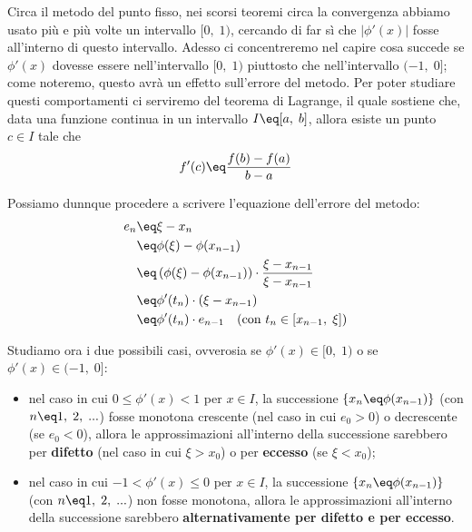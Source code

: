 Circa il metodo del punto fisso, nei scorsi teoremi circa la convergenza abbiamo usato più e più volte un intervallo $[0, \; 1)$, cercando di far sì che $|\phi'(x)|$ fosse all'interno di questo intervallo. Adesso ci concentreremo nel capire cosa succede se $\phi'(x)$ dovesse essere nell'intervallo $[0, \; 1)$ piuttosto che nell'intervallo $(-1, \; 0]$; come noteremo, questo avrà un effetto sull'errore del metodo. Per poter studiare questi comportamenti ci serviremo del teorema di Lagrange, il quale sostiene che, data una funzione continua in un intervallo $I \eq [a, \; b]$, allora esiste un punto $c \in I$ tale che
\[ f'(c) \eq \frac{f(b) - f(a)}{b - a} \]

Possiamo dunnque procedere a scrivere l'equazione dell'errore del metodo:
\begin{align*}
    e_n &\eq \xi - x_n \\
    &\eq \phi(\xi) - \phi(x_{n - 1}) \\
    &\eq \left(\phi(\xi) - \phi(x_{n - 1})\right) \cdot \frac{\xi - x_{n - 1}}{\xi - x_{n - 1}} \\
    &\eq \phi'(t_n) \cdot (\xi - x_{n - 1}) \\
    &\eq \phi'(t_n) \cdot e_{n - 1} \quad (\text{con } t_n \in [x_{n - 1}, \; \xi]) 
\end{align*}

Studiamo ora i due possibili casi, ovverosia se $\phi'(x) \in [0, \; 1)$ o se $\phi'(x) \in (-1, \; 0]$:
\begin{itemize}
    \item nel caso in cui $0 \leq \phi'(x) < 1$ per $x \in I$, la successione $\{x_n \eq \phi(x_{n - 1})\}$ (con $n \eq 1, \; 2, \; ...$) fosse monotona crescente (nel caso in cui $e_0 > 0$) o decrescente (se $e_0 < 0$), allora le approssimazioni all'interno della successione sarebbero per \textbf{difetto} (nel caso in cui $\xi > x_0$) o per \textbf{eccesso} (se $\xi < x_0$);
    \item nel caso in cui $-1 < \phi'(x) \leq 0$ per $x \in I$, la successione $\{x_n \eq \phi(x_{n - 1})\}$ (con $n \eq 1, \; 2, \; ...$) non fosse monotona, allora le approssimazioni all'interno della successione sarebbero \textbf{alternativamente per difetto e per eccesso}.
\end{itemize}